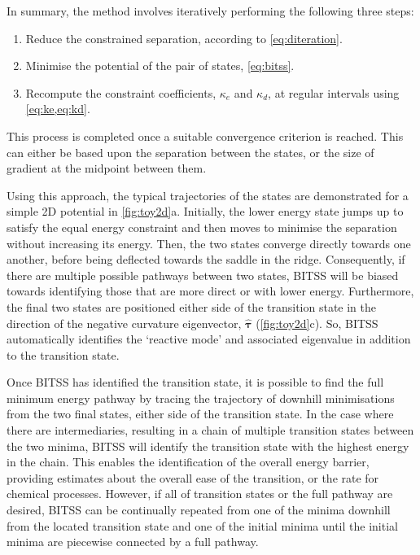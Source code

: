\documentclass[twocolumn,10pt]{revtex4}
\begin{document}
In summary, the method involves iteratively performing the following three steps:
\begin{enumerate}
  \item Reduce the constrained separation, according to \cref{eq:diteration}.
  \item Minimise the potential of the pair of states, \cref{eq:bitss}.
  \item Recompute the constraint coefficients, $\kappa_e$ and $\kappa_d$, at regular intervals using \cref{eq:ke,eq:kd}.
\end{enumerate}
This process is completed once a suitable convergence criterion is reached.
This can either be based upon the separation between the states, or the size of gradient at the midpoint between them.

Using this approach, the typical trajectories of the states are demonstrated for a simple 2D potential in \cref{fig:toy2d}a.
Initially, the lower energy state jumps up to satisfy the equal energy constraint and then moves to minimise the separation without increasing its energy.
Then, the two states converge directly towards one another, before being deflected towards the saddle in the ridge.
Consequently, if there are multiple possible pathways between two states, BITSS will be biased towards identifying those that are more direct or with lower energy.
Furthermore, the final two states are positioned either side of the transition state in the direction of the negative curvature eigenvector, $\bm{\hat{\tau}}$ (\cref{fig:toy2d}c).
So, BITSS automatically identifies the `reactive mode' and associated eigenvalue in addition to the transition state.

Once BITSS has identified the transition state, it is possible to find the full minimum energy pathway by tracing the trajectory of downhill minimisations from the two final states, either side of the transition state.
In the case where there are intermediaries, resulting in a chain of multiple transition states between the two minima, BITSS will identify the transition state with the highest energy in the chain.
This enables the identification of the overall energy barrier, providing estimates about the overall ease of the transition, or the rate for chemical processes.
However, if all of transition states or the full pathway are desired, BITSS can be continually repeated from one of the minima downhill from the located transition state and one of the initial minima until the initial minima are piecewise connected by a full pathway.
\end{document}
